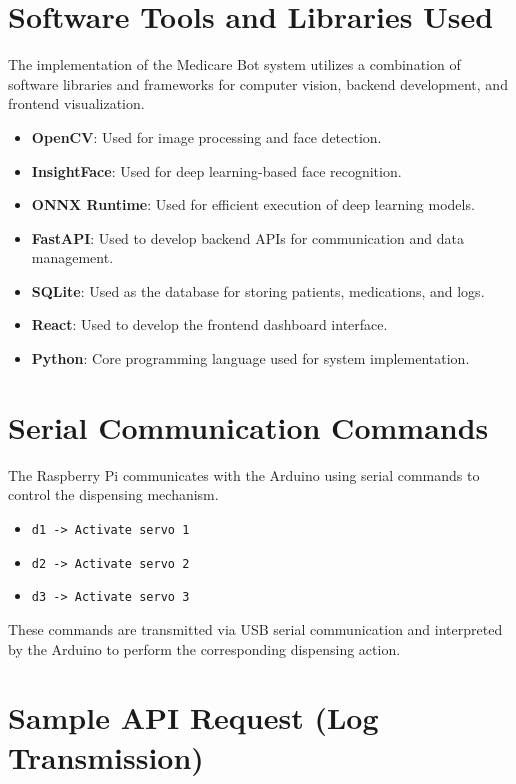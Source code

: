 \section{Software Tools and Libraries Used}

The implementation of the Medicare Bot system utilizes a combination of software libraries and frameworks for computer vision, backend development, and frontend visualization.

\begin{itemize}
\item \textbf{OpenCV}: Used for image processing and face detection.
\item \textbf{InsightFace}: Used for deep learning-based face recognition.
\item \textbf{ONNX Runtime}: Used for efficient execution of deep learning models.
\item \textbf{FastAPI}: Used to develop backend APIs for communication and data management.
\item \textbf{SQLite}: Used as the database for storing patients, medications, and logs.
\item \textbf{React}: Used to develop the frontend dashboard interface.
\item \textbf{Python}: Core programming language used for system implementation.
\end{itemize}

\section{Serial Communication Commands}

The Raspberry Pi communicates with the Arduino using serial commands to control the dispensing mechanism.

\begin{itemize}
\item \texttt{d1 -> Activate servo 1}
\item \texttt{d2 -> Activate servo 2}
\item \texttt{d3 -> Activate servo 3}
\end{itemize}

These commands are transmitted via USB serial communication and interpreted by the Arduino to perform the corresponding dispensing action.

\section{Sample API Request (Log Transmission)}

